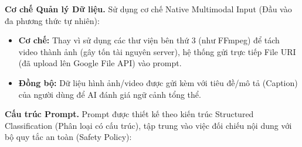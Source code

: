 \textbf{Cơ chế Quản lý Dữ liệu.} Sử dụng cơ chế Native Multimodal Input (Đầu vào đa phương thức tự nhiên):

\begin{itemize}
    \item \textbf{Cơ chế:} Thay vì sử dụng các thư viện bên thứ 3 (như FFmpeg) để tách video thành ảnh (gây tốn tài nguyên server), hệ thống gửi trực tiếp File URI (đã upload lên Google File API) vào prompt.
    \item \textbf{Đồng bộ:} Dữ liệu hình ảnh/video được gửi kèm với tiêu đề/mô tả (Caption) của người dùng để AI đánh giá ngữ cảnh tổng thể.
\end{itemize}

\textbf{Cấu trúc Prompt.} Prompt được thiết kế theo kiến trúc Structured Classification (Phân loại có cấu trúc), tập trung vào việc đối chiếu nội dung với bộ quy tắc an toàn (Safety Policy):

